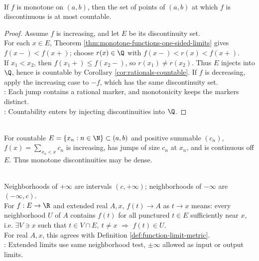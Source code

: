 \begin{theorem} \label{thm:monotone-discontinuities-countable} \\
If $f$ is monotone on $(a,b)$, then the set of points of $(a,b)$ at which $f$ is discontinuous is at most countable.
\begin{proof}
Assume $f$ is increasing, and let $E$ be its discontinuity set.\\
For each $x\in E$, Theorem \ref{thm:monotone-functions-one-sided-limits} gives $f(x-)<f(x+)$; choose $r(x)\in\Q$ with $f(x-)<r(x)<f(x+)$.\\
If $x_1<x_2$, then $f(x_1+)\leq f(x_2-)$, so $r(x_1)\neq r(x_2)$. Thus $E$ injects into $\Q$, hence is countable by Corollary \ref{cor:rationals-countable}. If $f$ is decreasing, apply the increasing case to $-f$, which has the same discontinuity set.\\
: Each jump contains a rational marker, and monotonicity keeps the markers distinct.\\
: Countability enters by injecting discontinuities into $\Q$.
\end{proof}
\end{theorem}

\begin{remark} \label{rem:monotone-discontinuities-need-not-be-isolated} \\
For countable $E=\{x_n:n\in\N\}\subset(a,b)$ and positive summable $(c_n)$, $f(x)=\sum\limits_{x_n<x}c_n$ is increasing, has jumps of size $c_n$ at $x_n$, and is continuous off $E$. Thus monotone discontinuities may be dense.
\end{remark}

\begin{definition} \label{def:extended-real-function-limits} \\
Neighborhoods of $+\infty$ are intervals $(c,+\infty)$; neighborhoods of $-\infty$ are $(-\infty,c)$.\\
For $f:E\to\R$ and extended real $A,x$, $f(t)\to A$ as $t\to x$ means: every neighborhood $U$ of $A$ contains $f(t)$ for all punctured $t\in E$ sufficiently near $x$, i.e. $\exists V\ni x$ such that $t\in V\cap E,\ t\neq x$ $\Longrightarrow$ $f(t)\in U$.\\
For real $A,x$, this agrees with Definition \ref{def:function-limit-metric}.\\
: Extended limits use same neighborhood test, $\pm\infty$ allowed as input or output limits.
\end{definition}

